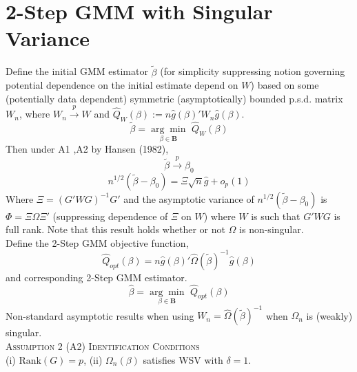 \documentclass[11pt, fleqn]{article}
\begin{document}
\section{ 2-Step GMM with Singular Variance}
Define the initial  GMM estimator $\tilde{\beta}$ (for simplicity suppressing  notion governing  potential dependence on the initial estimate depend on $W$) based on some (potentially data dependent) symmetric  (asymptotically) bounded p.s.d. matrix $W_n$, where $W_n\overset{p}{\rightarrow}W$ and  $\hat{Q}_W(\beta) :=n\hat{g}(\beta)'W_n\hat{g}(\beta)$.
\begin{equation} \label{initial} \tilde{\beta}=\underset{\beta \in \mathbf{B}}{\arg \min} \hspace{4pt} \hat{Q}_W(\beta) \end{equation}
 Then under A1 ,A2 by Hansen (1982),
 \begin{equation}\tilde{\beta}\overset{p}{\rightarrow} \beta_0\end{equation}
\begin{equation} n^{1/2}(\tilde{\beta}-\beta_0)=\Xi\sqrt{n}\hat{g}+o_p(1)\end{equation}
Where $\Xi=(G'WG)^{-1}G'$ and the asymptotic variance of $n^{1/2}(\tilde{\beta}-\beta_0)$ is $\Phi=\Xi \Omega \Xi'$  (suppressing   dependence of $\Xi$  on $W$) where $W$ is such that $G'WG$ is full rank. Note that this result holds whether or not $\Omega$ is non-singular.\\
Define the 2-Step GMM objective function,
  \begin{equation}\hat{Q}_{opt}(\beta)=n\hat{g}(\beta)'\hat{\Omega}(\tilde{\beta})^{-1}\hat{g}(\beta)\end{equation}
   and corresponding 2-Step GMM estimator.
  \begin{equation} \hat{\beta}=\underset{\beta \in \mathbf{B}}{\arg \min} \hspace{4pt} \hat{Q}_{opt}(\beta) \end{equation}
Non-standard asymptotic results   when using $W_n=\hat{\Omega}(\tilde{\beta})^{-1}$ when $\Omega_n$ is (weakly) singular.\\

\textsc{Assumption 2 (A2)} \textsc{ Identification Conditions} \\
(i) $\textrm{Rank}(G)=p$,  (ii)
$\Omega_n(\beta)$ satisfies WSV with  $\delta=1$.\\
\end{document}
